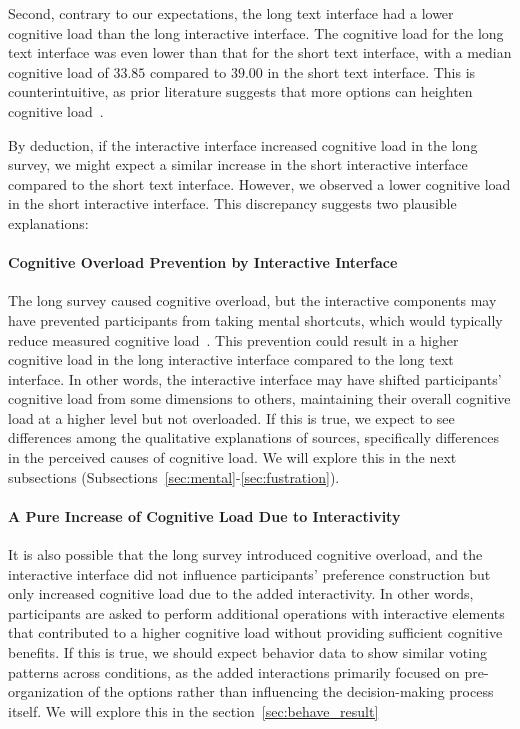 Second, contrary to our expectations, the long text interface had a lower cognitive load than the long interactive interface. The cognitive load for the long text interface was even lower than that for the short text interface, with a median cognitive load of $33.85$ compared to $39.00$ in the short text interface. This is counterintuitive, as prior literature suggests that more options can heighten cognitive load~\cite{swellerCognitiveLoadTheory2011}.

By deduction, if the interactive interface increased cognitive load in the long survey, we might expect a similar increase in the short interactive interface compared to the short text interface. However, we observed a lower cognitive load in the short interactive interface. This discrepancy suggests two plausible explanations:

\paragraph{Cognitive Overload Prevention by Interactive Interface} The long survey caused cognitive overload, but the interactive components may have prevented participants from taking mental shortcuts, which would typically reduce measured cognitive load~\cite{daniel2017thinking, simonBehavioralModelRational1955, payneAdaptiveStrategySelection1988, tverskyJudgmentsRepresentativeness}. This prevention could result in a higher cognitive load in the long interactive interface compared to the long text interface. In other words, the interactive interface may have shifted participants' cognitive load from some dimensions to others, maintaining their overall cognitive load at a higher level but not overloaded. If this is true, we expect to see differences among the qualitative explanations of sources, specifically differences in the perceived causes of cognitive load. We will explore this in the next subsections (Subsections~\ref{sec:mental}-\ref{sec:fustration}).

\paragraph{A Pure Increase of Cognitive Load Due to Interactivity} It is also possible that the long survey introduced cognitive overload, and the interactive interface did not influence participants' preference construction but only increased cognitive load due to the added interactivity. In other words, participants are asked to perform additional operations with interactive elements that contributed to a higher cognitive load without providing sufficient cognitive benefits. If this is true, we should expect behavior data to show similar voting patterns across conditions, as the added interactions primarily focused on pre-organization of the options rather than influencing the decision-making process itself. We will explore this in the section~\ref{sec:behave_result}

